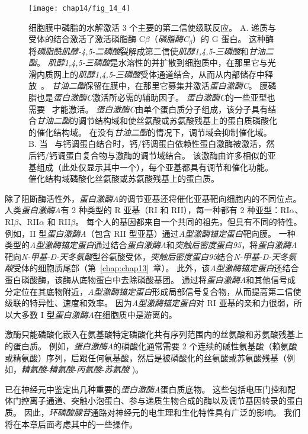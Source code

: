 \begin{figure}[htbp]
	\centering
	\texttt{[image: chap14/fig\_14\_4]}
	\caption{细胞膜中磷脂的水解激活 3 个主要的第二信使级联反应。
		A. 递质与受体的结合激活了激活磷脂酶 C$\beta$（\textit{磷脂酶C}$_\beta$）的 G 蛋白。
		这种酶将\textit{磷脂酰肌醇-4,5-二磷酸}裂解成第二信使\textit{肌醇1,4,5-三磷酸}和\textit{甘油二酯}。
		\textit{肌醇1,4,5-三磷酸}是水溶性的并扩散到细胞质中，在那里它与光滑内质网上的\textit{肌醇1,4,5-三磷酸}受体通道结合，从而从内部储存中释放~。
		\textit{甘油二酯}保留在膜中，在那里它募集并激活\textit{蛋白激酶C}。
		膜磷脂也是\textit{蛋白激酶C}激活所必需的辅助因子。
		\textit{蛋白激酶C}的一些亚型也需要~ 才能激活。
		\textit{蛋白激酶C}由单个蛋白质分子组成，该分子具有结合\textit{甘油二酯}的调节结构域和使丝氨酸或苏氨酸残基上的蛋白质磷酸化的催化结构域。
		在没有\textit{甘油二酯}的情况下，调节域会抑制催化域。
		B. 当~ 与钙调蛋白结合时，钙/钙调蛋白依赖性蛋白激酶被激活，然后钙/钙调蛋白复合物与激酶的调节域结合。
		该激酶由许多相似的亚基组成（此处仅显示其中一个），每个亚基都具有调节和催化功能。
		催化结构域磷酸化丝氨酸或苏氨酸残基上的蛋白质。}
	\label{fig:14_4}
\end{figure}


除了阻断酶活性外，\textit{蛋白激酶A}的调节亚基还将催化亚基靶向细胞内的不同位点。
人类\textit{蛋白激酶A}有 2 种类型的 R 亚基（RI 和 RII），每一种都有 2 种亚型：RI$\alpha$、RI$\beta$、RII$\alpha$ 和 RII$\beta$。
每个人的基因都来自一个共同的祖先，但具有不同的特性。
例如，II 型\textit{蛋白激酶A}（包含 RII 型亚基）通过\textit{A型激酶锚定蛋白}靶向膜。
一种类型的\textit{A型激酶锚定蛋白}通过结合\textit{蛋白激酶A}和\textit{突触后密度蛋白95}，将\textit{蛋白激酶A}靶向\textit{N-甲基-D-天冬氨酸}型谷氨酸受体，\textit{突触后密度蛋白95}结合\textit{N-甲基-D-天冬氨酸}受体的细胞质尾部（第~\ref{chap:chap13}~章）。
此外，该\textit{A型激酶锚定蛋白}还结合蛋白磷酸酶，该酶从底物蛋白中去除磷酸基团。
通过将\textit{蛋白激酶A}和其他信号成分定位在其底物附近，\textit{A型激酶锚定蛋白}形成局部信号复合物，从而提高第二信使级联的特异性、速度和效率。
因为\textit{A型激酶锚定蛋白}对 RI 亚基的亲和力很弱，所以大多数 I 型\textit{蛋白激酶A}在细胞质中是游离的。


激酶只能磷酸化嵌入在氨基酸特定磷酸化共有序列范围内的丝氨酸和苏氨酸残基上的蛋白质。
例如，\textit{蛋白激酶A}的磷酸化通常需要 2 个连续的碱性氨基酸（赖氨酸或精氨酸）序列，后跟任何氨基酸，然后是被磷酸化的丝氨酸或苏氨酸残基（例如，\textit{精氨酸}-\textit{精氨酸}-\textit{丙氨酸}-\textit{苏氨酸} )。


已在神经元中鉴定出几种重要的\textit{蛋白激酶A}蛋白质底物。
这些包括电压门控和配体门控离子通道、突触小泡蛋白、参与递质生物合成的酶以及调节基因转录的蛋白质。
因此，\textit{环磷酸腺苷}通路对神经元的电生理和生化特性具有广泛的影响。
我们将在本章后面考虑其中的一些操作。



